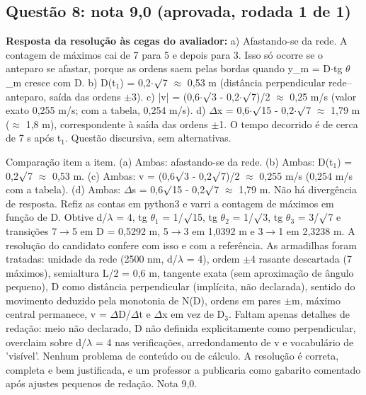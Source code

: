 \documentclass{article}%
\begin{document}
\subsection*{Questão 8: nota 9,0 (aprovada, rodada 1 de 1)}%
\textbf{Resposta da resolução às cegas do avaliador:} a) Afastando{-}se da rede. A contagem de máximos cai de 7 para 5 e depois para 3. Isso só ocorre se o anteparo se afastar, porque as ordens saem pelas bordas quando y\_m = D$\cdot$tg $\theta$\_m cresce com D.\newline%
\newline%
b) D(t$_{1}$) = 0,2$\cdot$$\surd$7 $\approx$ 0,53 m (distância perpendicular rede--anteparo, saída das ordens $\pm$3).\newline%
\newline%
c) |v| = (0,6$\cdot$$\surd$3 - 0,2$\cdot$$\surd$7)/2 $\approx$ 0,25 m/s (valor exato 0,255 m/s; com a tabela, 0,254 m/s).\newline%
\newline%
d) $\Delta$x = 0,6$\cdot$$\surd$15 - 0,2$\cdot$$\surd$7 $\approx$ 1,79 m ($\approx$ 1,8 m), correspondente à saída das ordens $\pm$1. O tempo decorrido é de cerca de 7 s após t$_{1}$.\newline%
\newline%
Questão discursiva, sem alternativas.\par %
Comparação item a item. (a) Ambas: afastando{-}se da rede. (b) Ambas: D(t$_{1}$) = 0,2$\surd$7 $\approx$ 0,53 m. (c) Ambas: v = (0,6$\surd$3 - 0,2$\surd$7)/2 $\approx$ 0,255 m/s (0,254 m/s com a tabela). (d) Ambas: $\Delta$s = 0,6$\surd$15 - 0,2$\surd$7 $\approx$ 1,79 m. Não há divergência de resposta. Refiz as contas em python3 e varri a contagem de máximos em função de D. Obtive d/$\lambda$ = 4, tg $\theta$$_{1}$ = 1/$\surd$15, tg $\theta$$_{2}$ = 1/$\surd$3, tg $\theta$$_{3}$ = 3/$\surd$7 e transições 7$\to$5 em D = 0,5292 m, 5$\to$3 em 1,0392 m e 3$\to$1 em 2,3238 m. A resolução do candidato confere com isso e com a referência. As armadilhas foram tratadas: unidade da rede (2500 nm, d/$\lambda$ = 4), ordem $\pm$4 rasante descartada (7 máximos), semialtura L/2 = 0,6 m, tangente exata (sem aproximação de ângulo pequeno), D como distância perpendicular (implícita, não declarada), sentido do movimento deduzido pela monotonia de N(D), ordens em pares $\pm$m, máximo central permanece, v = $\Delta$D/$\Delta$t e $\Delta$x em vez de D$_{3}$. Faltam apenas detalhes de redação: meio não declarado, D não definida explicitamente como perpendicular, overclaim sobre d/$\lambda$ = 4 nas verificações, arredondamento de v e vocabulário de 'visível'. Nenhum problema de conteúdo ou de cálculo. A resolução é correta, completa e bem justificada, e um professor a publicaria como gabarito comentado após ajustes pequenos de redação. Nota 9,0.%
\end{document}
